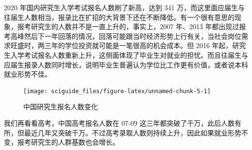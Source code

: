 \documentclass[]{tufte-book}
\newenvironment{Shaded}{}{}
\newcommand{\AttributeTok}[1]{\textcolor[rgb]{0.49,0.56,0.16}{#1}}
\newcommand{\CommentTok}[1]{\textcolor[rgb]{0.38,0.63,0.69}{\textit{#1}}}
\newcommand{\DecValTok}[1]{\textcolor[rgb]{0.25,0.63,0.44}{#1}}
\newcommand{\FunctionTok}[1]{\textcolor[rgb]{0.02,0.16,0.49}{#1}}
\newcommand{\NormalTok}[1]{#1}
\newcommand{\OtherTok}[1]{\textcolor[rgb]{0.00,0.44,0.13}{#1}}
\newcommand{\SpecialCharTok}[1]{\textcolor[rgb]{0.25,0.44,0.63}{#1}}
\newcommand{\StringTok}[1]{\textcolor[rgb]{0.25,0.44,0.63}{#1}}
\begin{document}
2020 年国内研究生入学考试报名人数刷了新高，达到 341 万，而这里面应届生与往届生人数相当，报录比在扩招的大背景下还在不断降低。有一个很有意思的现象，报考研究生的人数并不是一直上升的，事实上，2007 年、2013 年都出现过报考高峰然后下一年回落的情况，回落可能跟当时经济形势上行有关，当社会岗位需求旺盛时，两三年的学位投资就可能是一笔很高的机会成本。但 2016 年起，研究生入学考试报名人数重新上升，这侧面体现了毕业生对就业的担忧。而且往届生与应届生报录人数同时增长，说明毕业生普遍认为学位比工作更有价值，或者说本科就业形势不佳。

\begin{Shaded}
\end{Shaded}

\begin{figure}
\texttt{[image: sciguide\_files/figure-latex/unnamed-chunk-5-1]} \caption[中国研究生报名人数变化]{中国研究生报名人数变化}\label{fig:unnamed-chunk-5}
\end{figure}

我们再看看高考，中国高考报名人数在 07-09 这三年都突破了千万，此后人数有所，但最近几年又突破千万。不过高考录取人数则持续上升，因此如果就业形势不变，报考研究生的人群基数也会增长。
\end{document}
